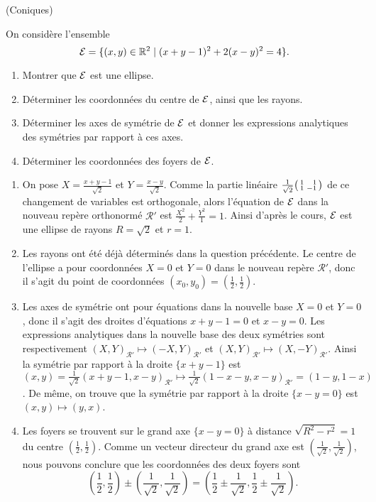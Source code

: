 \documentclass[a4paper,12pt,reqno]{amsart}
\begin{document}
\begin{exo} (Coniques)

On considère l'ensemble
  \[
    \mathcal{E}=\{ (x,y) \in \mathbb{R}^{2} \mid (x+y-1)^{2}+2(x-y)^{2}=4\}.
  \]

  \begin{enumerate}
    \item Montrer que $\mathcal{E}$ est une ellipse.
    \item Déterminer les coordonnées du centre de $\mathcal{E}$, ainsi que les rayons.
    \item Déterminer les axes de symétrie de $\mathcal{E}$ et donner les expressions analytiques des symétries par rapport à ces axes.
    \item Déterminer les coordonnées des foyers de $\mathcal{E}$.
  \end{enumerate}

\end{exo}

\begin{solution}
  \begin{enumerate}
    \item On pose $X = \frac{x+y-1}{\sqrt{2}}$ et $Y = \frac{x-y}{\sqrt{2}}$. Comme la partie linéaire
      $ \frac{1}{\sqrt{2}}
        \begin{psmallmatrix*}[r]
          1 & 1 \\
          1 & -1
        \end{psmallmatrix*}
      $ de ce changement de variables est orthogonale, alors l'équation de $\mathcal{E}$ dans la nouveau repère orthonormé $\mathcal{R}'$ est $ \frac{X^{2}}{2}+\frac{Y^{2}}{1}=1$. Ainsi d'après le cours, $\mathcal{E}$ est une ellipse de rayons $R = \sqrt{2}$ et $r = 1$.
    \item Les rayons ont été déjà déterminés dans la question précédente. Le centre de l'ellipse a pour coordonnées $X=0$ et $Y=0$ dans le nouveau repère $\mathcal{R}'$, donc il s'agit du point de coordonnées $(x_{0},y_{0}) = (\frac{1}{2}, \frac{1}{2})$.
    \item Les axes de symétrie ont pour équations dans la nouvelle base $X=0$ et $Y=0$, donc il s'agit des droites d'équations $x+y-1=0$ et $x-y=0$. Les expressions analytiques dans la nouvelle base des deux symétries sont respectivement $(X,Y)_{\mathcal{R}'} \mapsto (-X,Y)_{\mathcal{R}'}$ et $(X,Y)_{\mathcal{R}'} \mapsto (X,-Y)_{\mathcal{R}'}$. Ainsi la symétrie par rapport à la droite $\{x+y-1\}$ est $(x,y) = \frac{1}{\sqrt{2}}(x+y-1,x-y)_{\mathcal{R}'} \mapsto \frac{1}{\sqrt{2}}(1-x-y,x-y)_{\mathcal{R}'} = (1-y,1-x)$. De même, on trouve que la symétrie par rapport à la droite $\{x-y=0\}$ est $(x,y) \mapsto (y,x)$.
    \item Les foyers se trouvent sur le grand axe $\{x-y=0\}$ à distance $\sqrt{R^{2}-r^{2}} = 1$ du centre $(\frac{1}{2}, \frac{1}{2})$. Comme un vecteur directeur du grand axe est $(\frac{1}{\sqrt{2}},\frac{1}{\sqrt{2}})$, nous pouvons conclure que les coordonnées des deux foyers sont
    $$
      (\frac{1}{2}, \frac{1}{2}) \pm (\frac{1}{\sqrt{2}},\frac{1}{\sqrt{2}}) = (\frac{1}{2} \pm \frac{1}{\sqrt{2}}, \frac{1}{2} \pm \frac{1}{\sqrt{2}}).
    $$
  \end{enumerate}

\end{solution}
\end{document}

